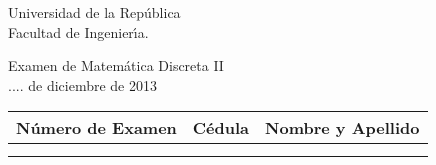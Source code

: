 \documentclass{article}
\theoremstyle{definition}
\begin{document}
\begin{flushleft} 
Universidad de la Rep\'ublica\\
Facultad de Ingenier\'\i a.
\end{flushleft}

\begin{center}
Examen de Matem\'atica Discreta II\\
.... de diciembre de 2013\\

\vspace{0.1cm}

\begin{tabular}{|c|c|c|}
\hline
N\'umero de Examen &\hspace{1.0cm} C\'edula \hspace{1.2cm} & \hspace{1.3cm} Nombre y Apellido \hspace{1.5cm} \\
\hline
 & & \\
 & & \\
\hline
\end{tabular}
\end{center}

\vspace{0.3cm}
\end{document}
